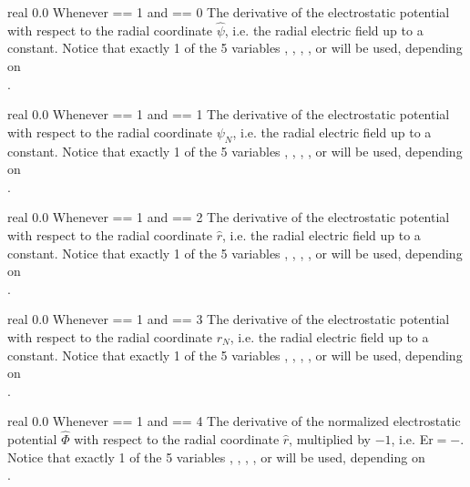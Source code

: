 \myhrule

{real}
{0.0}
{Whenever  == 1 and  == 0}
{The derivative of the electrostatic potential with respect to the radial coordinate $\hat{\psi}$,
i.e. the radial electric field up to a constant.
Notice that exactly 1 of the 5 variables , , , , or 
will be used, depending on\\
.
}

\myhrule

{real}
{0.0}
{Whenever  == 1 and  == 1}
{The derivative of the electrostatic potential with respect to the radial coordinate $\psi_N$,
i.e. the radial electric field up to a constant.
Notice that exactly 1 of the 5 variables , , , , or 
will be used, depending on\\
.
}

\myhrule

{real}
{0.0}
{Whenever  == 1 and  == 2}
{The derivative of the electrostatic potential with respect to the radial coordinate $\hat{r}$,
i.e. the radial electric field up to a constant.
Notice that exactly 1 of the 5 variables , , , , or 
will be used, depending on\\
.
}

\myhrule

{real}
{0.0}
{Whenever  == 1 and  == 3}
{The derivative of the electrostatic potential with respect to the radial coordinate $r_N$,
i.e. the radial electric field up to a constant.
Notice that exactly 1 of the 5 variables , , , , or 
will be used, depending on\\
.
}


\myhrule

{real}
{0.0}
{Whenever  == 1 and  == 4}
{The derivative of the normalized electrostatic potential $\hat{\Phi}$ with respect to the radial coordinate $\hat{r}$, multiplied by $-1$,
i.e. {\ttfamily Er}$=-$.
Notice that exactly 1 of the 5 variables , , , , or 
will be used, depending on\\
.
}


